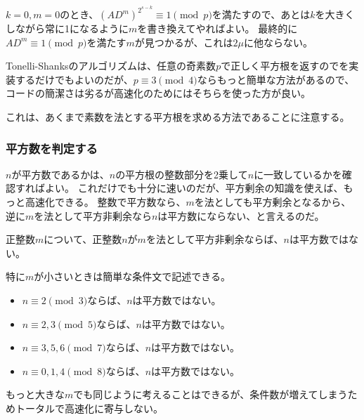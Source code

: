 $k=0,m=0$のとき、$(AD^m)^{2^{s-k}}\equiv1\pmod{p}$を満たすので、あとは$k$を大きくしながら常に1になるように$m$を書き換えてやればよい。
最終的に$AD^m\equiv1\pmod{p}$を満たす$m$が見つかるが、これは$2\mu$に他ならない。

Tonelli-Shanksのアルゴリズムは、任意の奇素数$p$で正しく平方根を返すのでを実装するだけでもよいのだが、$p\equiv3\pmod{4}$ならもっと簡単な方法があるので、コードの簡潔さは劣るが高速化のためにはそちらを使った方が良い。


これは、あくまで素数を法とする平方根を求める方法であることに注意する。

\subsubsection{平方数を判定する}
\label{sssec:quadratic_residue_square}
$n$が平方数であるかは、$n$の平方根の整数部分を2乗して$n$に一致しているかを確認すればよい。
これだけでも十分に速いのだが、平方剰余の知識を使えば、もっと高速化できる。
整数で平方数なら、$m$を法としても平方剰余となるから、逆に$m$を法として平方非剰余なら$n$は平方数にならない、と言えるのだ。

\begin{Prop}{}{}
正整数$m$について、正整数$n$が$m$を法として平方非剰余ならば、$n$は平方数ではない。
\end{Prop}

特に$m$が小さいときは簡単な条件文で記述できる。

\begin{itemize}
 \item $n\equiv2\pmod{3}$ならば、$n$は平方数ではない。
 \item $n\equiv2,3\pmod{5}$ならば、$n$は平方数ではない。
 \item $n\equiv3,5,6\pmod{7}$ならば、$n$は平方数ではない。
 \item $n\equiv0,1,4\pmod{8}$ならば、$n$は平方数ではない。
\end{itemize}

もっと大きな$m$でも同じように考えることはできるが、条件数が増えてしまうためトータルで高速化に寄与しない。


